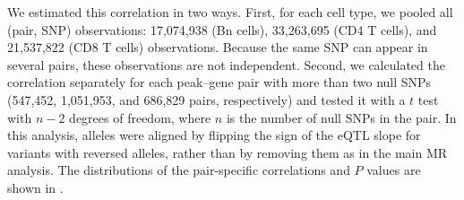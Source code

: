 \noindent We estimated this correlation in two ways. First, for each cell type, we pooled all (pair, SNP) observations: 17,074,938 (Bn cells), 33,263,695 (CD4 T cells), and 21,537,822 (CD8 T cells) observations. Because the same SNP can appear in several pairs, these observations are not independent. Second, we calculated the correlation separately for each peak--gene pair with more than two null SNPs (547,452, 1,051,953, and 686,829 pairs, respectively) and tested it with a $t$ test with $n-2$ degrees of freedom, where $n$ is the number of null SNPs in the pair. In this analysis, alleles were aligned by flipping the sign of the eQTL slope for variants with reversed alleles, rather than by removing them as in the main MR analysis. The distributions of the pair-specific correlations and $P$ values are shown in .
